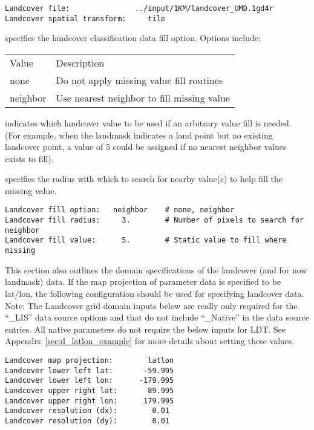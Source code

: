  \begin{Verbatim}[frame=single]
Landcover file:               ../input/1KM/landcover_UMD.1gd4r
Landcover spatial transform:     tile
 \end{Verbatim}

 
  specifies the landcover classification
  data fill option.  Options include:

 \begin{tabular}{ll}
 Value      & Description                                  \\
 none       &  Do not apply missing value fill routines    \\
 neighbor   &  Use nearest neighbor to fill missing value  \\
 \end{tabular}

  indicates which landcover
 value to be used if an arbitrary value fill is needed. 
 (For example, when the landmask indicates a land point but no existing 
 landcover point, a value of 5 could be assigned if 
 no nearest neighbor values exists to fill).

  specifies the radius with which
 to search for nearby value(s) to help fill the missing value.
 

 \begin{Verbatim}[frame=single]
Landcover fill option:   neighbor    # none, neighbor
Landcover fill radius:     3.        # Number of pixels to search for neighbor
Landcover fill value:      5.        # Static value to fill where missing
 \end{Verbatim}

 
 This section also outlines the domain specifications of the 
 landcover (and for now landmask) data. 
 If the map projection of parameter data is specified to be lat/lon, 
 the following configuration should be used for specifying landcover
 data.
 Note: The Landcover grid domain inputs below are really only required
  for the ``\_LIS'' data source options and that do not include ``\_Native''
  in the data source entries. All native parameters do not require
  the below inputs for LDT.
 See Appendix~\ref{sec:d_latlon_example} for more details about
 setting these values. 
 

 \begin{Verbatim}[frame=single]
Landcover map projection:        latlon
Landcover lower left lat:       -59.995
Landcover lower left lon:      -179.995
Landcover upper right lat:       89.995
Landcover upper right lon:      179.995
Landcover resolution (dx):        0.01
Landcover resolution (dy):        0.01
 \end{Verbatim}

